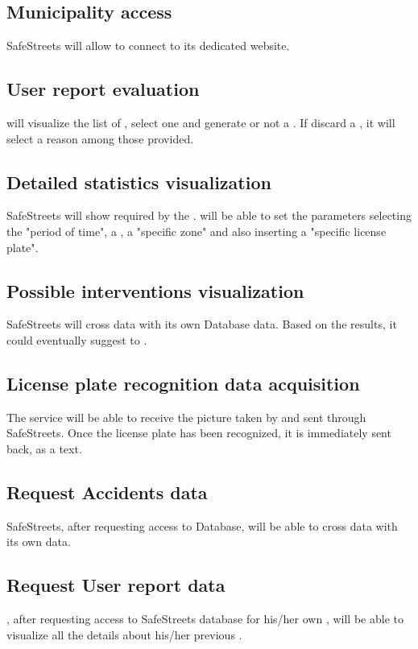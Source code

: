 \documentclass[../../RASD.tex]{subfiles}
\begin{document}
	\subsection{Municipality access}
	SafeStreets will allow  to connect to its dedicated website.  
	
	\subsection{User report evaluation}
	 will visualize the list of , select one and generate or not a . If  discard a , it will select a reason among those provided.
	
	\subsection{Detailed statistics visualization}
	SafeStreets will show  required by the .  will be able to set the parameters selecting the "period of time", a , a "specific zone" and also inserting a "specific license plate". 
	
	\subsection{Possible interventions visualization}
	SafeStreets will cross   data with its own Database data. Based on the results, it could eventually suggest  to . 
	
	\subsection{License plate recognition data acquisition}
	The service will be able to receive the picture taken by  and sent through SafeStreets. Once the license plate has been recognized, it is immediately sent back, as a text.
	
	\subsection{Request Accidents data}
	SafeStreets, after requesting access to   Database, will be able to cross  data with its own data. 
	
	\subsection{Request User report data}
	, after requesting access to SafeStreets database for his/her own , will be able to visualize all the details about his/her previous . 
	
\end{document}
